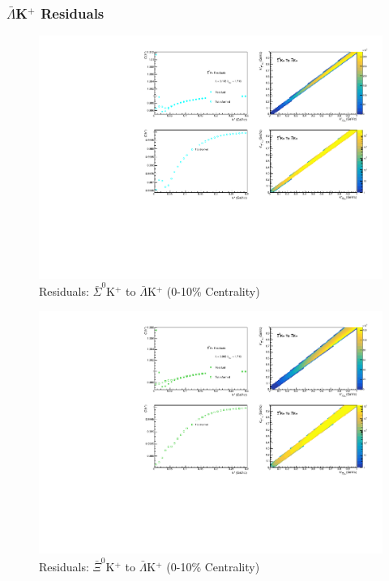 \documentclass[../AnalysisNoteJBuxton.tex]{subfiles}
\begin{document}
\subsubsection{\texorpdfstring{$\bar{\Lambda}$K$^{+}$}{TEXT} Residuals}
\label{Residuals_ALamKchP}

\begin{figure}[h]
  \centering
  \includegraphics[width=\textwidth]{9_AdditionalFigures/Figures/Residuals/ALamKchP/Residuals_ALamKchP_0010_ASig0KchP_MomResCrctn_NonFlatBgdCrctn_10Res_PrimMaxDecay4fm_UsingXiDataAndCoulombOnly.pdf}
  \caption[Residuals: $\bar{\Sigma}^{0}$K$^{+}$ to $\bar{\Lambda}$K$^{+}$ (0-10\% Centrality)]{Residuals: $\bar{\Sigma}^{0}$K$^{+}$ to $\bar{\Lambda}$K$^{+}$ (0-10\% Centrality)}
  \label{fig:Res_ALamKchP_0010_ASig0KchP}
\end{figure}

\begin{figure}[h]
  \centering
  \includegraphics[width=\textwidth]{9_AdditionalFigures/Figures/Residuals/ALamKchP/Residuals_ALamKchP_0010_AXi0KchP_MomResCrctn_NonFlatBgdCrctn_10Res_PrimMaxDecay4fm_UsingXiDataAndCoulombOnly.pdf}
  \caption[Residuals: $\bar{\Xi}^{0}$K$^{+}$ to $\bar{\Lambda}$K$^{+}$ (0-10\% Centrality)]{Residuals: $\bar{\Xi}^{0}$K$^{+}$ to $\bar{\Lambda}$K$^{+}$ (0-10\% Centrality)}
  \label{fig:Res_ALamKchP_0010_AXi0KchP}
\end{figure}
\end{document}
